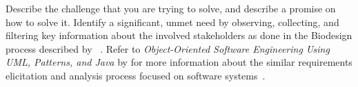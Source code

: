 \begin{tcolorbox}[breakable]
	Describe the challenge that you are trying to solve, and describe a promise on how to solve it.
	Identify a significant, unmet need by observing, collecting, and filtering key information about the involved stakeholders as done in the Biodesign process described by \citeauthor{yock2015biodesign}~\cite{yock2015biodesign}.
	Refer to \textit{Object-Oriented Software Engineering Using UML, Patterns, and Java} by \citeauthor{bruegge2013object} for more information about the similar requirements elicitation and analysis process focused on software systems~\cite{bruegge2013object}.

\end{tcolorbox}
